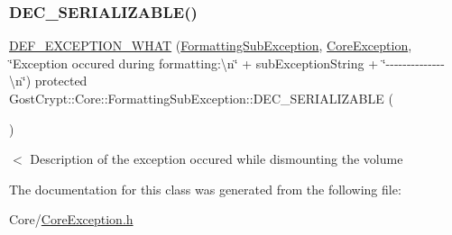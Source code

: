\subsubsection{\texorpdfstring{D\+E\+C\+\_\+\+S\+E\+R\+I\+A\+L\+I\+Z\+A\+B\+L\+E()}{DEC\_SERIALIZABLE()}}
{\footnotesize\ttfamily \hyperlink{_gost_crypt_exception_8h_a5bc1e1c6c9d6f46c84eeba49e33355f9}{D\+E\+F\+\_\+\+E\+X\+C\+E\+P\+T\+I\+O\+N\+\_\+\+W\+H\+AT} (\hyperlink{class_gost_crypt_1_1_core_1_1_formatting_sub_exception}{Formatting\+Sub\+Exception}, \hyperlink{class_gost_crypt_1_1_core_1_1_core_exception}{Core\+Exception}, \char`\"{}Exception occured during formatting\+:\textbackslash{}n\char`\"{} + sub\+Exception\+String + \char`\"{}-\/-\/-\/-\/-\/-\/-\/-\/-\/-\/-\/-\/-\/-\/\textbackslash{}n\char`\"{}) protected Gost\+Crypt\+::\+Core\+::\+Formatting\+Sub\+Exception\+::\+D\+E\+C\+\_\+\+S\+E\+R\+I\+A\+L\+I\+Z\+A\+B\+LE (\begin{DoxyParamCaption}\item[{\hyperlink{class_gost_crypt_1_1_core_1_1_formatting_sub_exception}{Formatting\+Sub\+Exception}}]{ }\end{DoxyParamCaption})}

$<$ Description of the exception occured while dismounting the volume 

The documentation for this class was generated from the following file\+:\begin{DoxyCompactItemize}
\item 
Core/\hyperlink{_core_exception_8h}{Core\+Exception.\+h}\end{DoxyCompactItemize}
